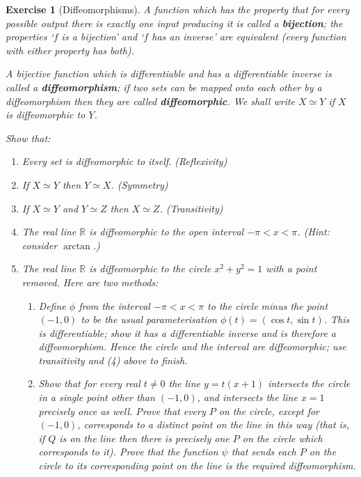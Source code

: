 \documentclass[a4paper,leqno,10pt]{article}
\theoremstyle{exercise}
\newtheorem{Exercise}{Exercise}
\newenvironment{exercise}
  {\begin{mdframed}\begin{Exercise}}
  {\end{Exercise}\end{mdframed}}
\theoremstyle{plain}
\theoremstyle{definition}
\theoremstyle{remark}
\newcommand{\df}{\textbf}
\begin{document}
\begin{exercise}[Diffeomorphisms]
  A function which has the property that for every possible output there is exactly one input producing it is called
  a \df{bijection}; the properties `$ f $ is a bijection' and `$ f $ has an inverse' are equivalent (every function with
  either property has both).

  A bijective function which is differentiable and has a differentiable inverse is called a \df{diffeomorphism}; if two
  sets can be mapped onto each other by a diffeomorphism then they are called \df{diffeomorphic}. We shall write $ X \simeq Y $
  if $ X $ is diffeomorphic to $ Y $.

  Show that:
  \begin{enumerate}
    \item Every set is diffeomorphic to itself. (Reflexivity)
    \item If $ X \simeq Y $ then $ Y \simeq X $. (Symmetry)
    \item If $ X \simeq Y $ and $ Y \simeq Z $ then $ X \simeq Z $. (Transitivity)
    \item The real line $ \mathbb{R} $ is diffeomorphic to the open interval $ -\pi < x < \pi $. (Hint: consider $ \arctan $.)
    \item The real line $ \mathbb{R} $ is diffeomorphic to the circle $ x^2 + y^2 = 1 $ with a point removed. Here are two methods:
      \begin{enumerate}
        \item Define $ \phi $ from the interval $ -\pi < x < \pi $ to the circle minus the point $ (-1,0) $ to be
              the usual parameterisation $ \phi(t) = (\cos t, \sin t) $. This is differentiable; show it has a
              differentiable inverse and is therefore a diffeomorphism. Hence the circle and the interval are
              diffeomorphic; use transitivity and (4) above to finish.
        \item Show that for every real $ t \neq 0 $ the line $ y = t(x + 1) $ intersects the circle in a single point other than $ (-1,0) $, and intersects
              the line $ x = 1 $ precisely once as well. Prove that every $ P $ on the circle, except for $ (-1,0) $, corresponds to a distinct point on the
              line in this way (that is, if $ Q $ is on the line then there is precisely one $ P $ on the circle which corresponds to it). Prove that
              the function $ \psi $ that sends each $ P $ on the circle to its corresponding point on the line is the required diffeomorphism.
      \end{enumerate}
  \end{enumerate}
\end{exercise}
\end{document}
